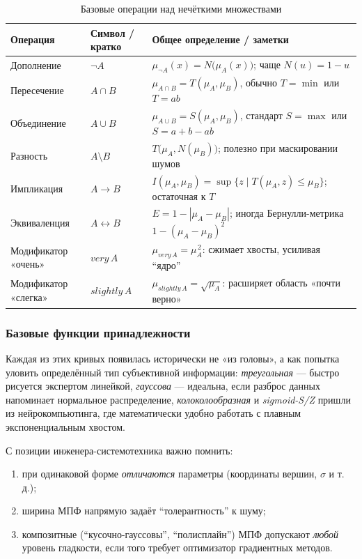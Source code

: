 \begin{table}[h]
\centering
\caption{Базовые операции над нечёткими множествами}
\label{tab:baseops}
\begin{tabularx}{\linewidth}{@{}p{2.8cm}p{3.2cm}X@{}}
\toprule
\textbf{Операция} & \textbf{Символ / кратко} & \textbf{Общее определение / заметки} \\ \midrule
Дополнение & $\neg A$ &
$\mu_{\neg A}(x)=N\!\bigl(\mu_A(x)\bigr)$;
чаще $N(u)=1-u$ \\[0.3em]
Пересечение & $A\cap B$ &
$\mu_{A\cap B}=T(\mu_A,\mu_B)$,
	обычно $T=\min$ или $T=ab$ \\[0.3em]
Объединение & $A\cup B$ &
$\mu_{A\cup B}=S(\mu_A,\mu_B)$,
	стандарт $S=\max$ или $S=a+b-ab$ \\[0.3em]
Разность & $A\setminus B$ &
$T\bigl(\mu_A,N(\mu_B)\bigr)$;
полезно при маскировании шумов \\[0.3em]
Импликация & $A\!\to\!B$ &
$I(\mu_A,\mu_B)=\sup\{z\mid T(\mu_A,z)\le\mu_B\}$;
остаточная к $T$ \\[0.3em]
Эквиваленция & $A\!\leftrightarrow\!B$ &
$E=1-|\mu_A-\mu_B|$;
иногда Бернулли-метрика $1-(\mu_A-\mu_B)^2$ \\[0.3em]
Модификатор «очень» & $very\,A$ &
$\mu_{very\,A}=\mu_A^{\,2}$:
сжимает хвосты, усиливая “ядро” \\[0.3em]
Модификатор «слегка» & $slightly\,A$ &
$\mu_{slightly\,A}=\sqrt{\mu_A}$:
расширяет область «почти верно» \\ \bottomrule
\end{tabularx}
\end{table}
\newpage
\subsubsection{Базовые функции принадлежности}

Каждая из этих кривых появилась исторически не «из головы»,
а как попытка уловить определённый тип субъективной информации:  
\emph{треугольная} — быстро рисуется экспертом линейкой,  
\emph{гауссова} — идеальна, если разброс данных напоминает
нормальное распределение,  
\emph{колоколообразная} и \emph{sigmoid-S/Z} пришли
из нейрокомпьютинга, где математически удобно
работать с плавным экспоненциальным хвостом.  

С позиции инженера-системотехника важно помнить:
\begin{enumerate}
  \item при одинаковой форме \emph{отличаются} параметры
        (координаты вершин, $\sigma$ и т.\,д.);
  \item ширина МПФ напрямую задаёт “толерантность” к шуму;
  \item композитные (“кусочно-гауссовы”, “полисплайн”) МПФ
        допускают \emph{любой} уровень гладкости,
        если того требует оптимизатор градиентных методов.
\end{enumerate}


